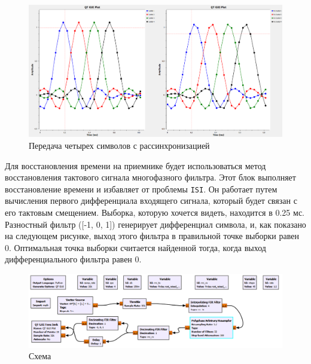 \documentclass[a4paper]{article}
\begin{document}
            \begin{figure}[H]
                \centering
                \includegraphics[width=\textwidth]{img/p3_4.png}
                \caption{Передача четырех символов с рассинхронизацией}
                \label{fig:p3_4}
            \end{figure}
            
            Для восстановления времени на приемнике будет использоваться метод восстановления тактового сигнала многофазного фильтра. Этот блок выполняет восстановление времени и избавляет от проблемы \texttt{ISI}. Он работает путем вычисления первого дифференциала входящего сигнала, который будет связан с его тактовым смещением. Выборка, которую хочется видеть, находится в 0.25 мс. Разностный фильтр ([-1, 0, 1]) генерирует дифференциал символа, и, как показано на следующем рисунке, выход этого фильтра в правильной точке выборки равен 0. Оптимальная точка выборки считается найденной тогда, когда выход дифференциального фильтра равен 0.
            
            \begin{figure}[H]
                \centering
                \includegraphics[width=\textwidth]{img/p3_5.png}
                \caption{Схема}
                \label{fig:p3_5}
            \end{figure}
            
\end{document}
